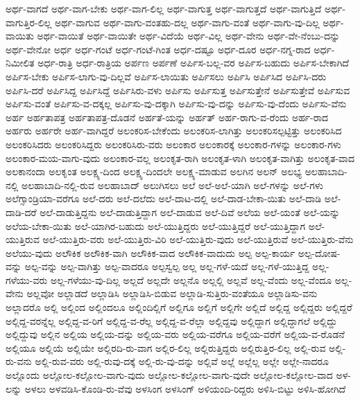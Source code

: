 {ಅರ್ಥ-ವಾಗದೆ
ಅರ್ಥ-ವಾಗ-ಬೇಕು
ಅರ್ಥ-ವಾಗ-ಲಿಲ್ಲ
ಅರ್ಥ-ವಾಗುತ್ತ
ಅರ್ಥ-ವಾಗುತ್ತದೆ
ಅರ್ಥ-ವಾಗುತ್ತಿದೆ
ಅರ್ಥ-ವಾಗುತ್ತಿರ-ಲಿಲ್ಲ
ಅರ್ಥ-ವಾಗುವ
ಅರ್ಥ-ವಾಗು-ವಂತಹು-ದಲ್ಲ
ಅರ್ಥ-ವಾಗು-ವಂತೆ
ಅರ್ಥ-ವಾಗು-ವು-ದಿಲ್ಲ
ಅರ್ಥ-ವಾಯಿತು
ಅರ್ಥ-ವಾಯಿತೆ
ಅರ್ಥ-ವಾಯಿತೇ
ಅರ್ಥ-ವಿದೆಯೆ
ಅರ್ಥ-ವಿಲ್ಲ
ಅರ್ಥ-ವೇನು
ಅರ್ಥ-ವೇ-ನೆಂಬು-ದನ್ನು
ಅರ್ಥ-ವೇನೋ
ಅರ್ಧ
ಅರ್ಧ-ಗಂಟೆ
ಅರ್ಧ-ಗಂಟೆ-ಗಿಂತ
ಅರ್ಧ-ದಷ್ಟೂ
ಅರ್ಧ-ದೂರ
ಅರ್ಧ-ನಗ್ನ-ರಾದ
ಅರ್ಧ-ನಿಮೀಲಿತ
ಅರ್ಧ-ರಾತ್ರಿ
ಅರ್ಧ-ರಾತ್ರಿಯ
ಅರ್ಪಣ
ಅರ್ಪಣೆ
ಅರ್ಪಿಸ-ಬಲ್ಲ-ವರ
ಅರ್ಪಿಸ-ಬಹುದು
ಅರ್ಪಿಸ-ಬೇಕಾಗಿದೆ
ಅರ್ಪಿಸ-ಬೇಕು
ಅರ್ಪಿಸ-ಲಾಗು-ವು-ದಿಲ್ಲವೆ
ಅರ್ಪಿಸ-ಲಾಯಿತು
ಅರ್ಪಿಸಲು
ಅರ್ಪಿಸಿ
ಅರ್ಪಿಸಿದ
ಅರ್ಪಿಸಿ-ದರು
ಅರ್ಪಿಸಿ-ದರೆ
ಅರ್ಪಿಸಿದ್ದ
ಅರ್ಪಿಸಿದ್ದೆ
ಅರ್ಪಿಸಿರು-ವಳು
ಅರ್ಪಿಸು
ಅರ್ಪಿಸುತ್ತ
ಅರ್ಪಿಸುತ್ತೇನೆ
ಅರ್ಪಿಸುತ್ತೇವೆ
ಅರ್ಪಿಸುವ
ಅರ್ಪಿಸು-ವಂತೆ
ಅರ್ಪಿಸು-ವ-ದಕ್ಕಲ್ಲ
ಅರ್ಪಿಸು-ವು-ದಕ್ಕಾಗಿ
ಅರ್ಪಿಸು-ವು-ದನ್ನು
ಅರ್ಪಿಸು-ವು-ದೆಂದು
ಅರ್ಪಿಸು-ವೆನು
ಅರ್ಹ
ಅರ್ಹತಾಪತ್ರ
ಅರ್ಹತಾಪತ್ರ-ದೊಡನೆ
ಅರ್ಹತೆ-ಯನ್ನು
ಅರ್ಹತ್
ಅರ್ಹ-ರಾಗು-ವ-ರೆಂದು
ಅರ್ಹ-ರಾದ
ಅರ್ಹರು
ಅರ್ಹರೇ
ಅರ್ಹ-ವಾಗಿದ್ದರೆ
ಅಲಂಕರಿಸ-ಬೇಕೆಂದು
ಅಲಂಕರಿಸ-ಲಾಗಿತ್ತು
ಅಲಂಕರಿಸಲ್ಪಟ್ಟಿತ್ತು
ಅಲಂಕರಿಸಿದ
ಅಲಂಕರಿಸಿದರು
ಅಲಂಕರಿಸಿದ್ದರು
ಅಲಂಕರಿಸಿರು-ವರು
ಅಲಂಕಾರ
ಅಲಂಕಾರಕ್ಕೆ
ಅಲಂಕಾರ-ಗಳನ್ನು
ಅಲಂಕಾರ-ಗಳು
ಅಲಂಕಾರ-ಮಯ-ವಾಗು-ವುದು
ಅಲಂಕಾರ-ವಲ್ಲ
ಅಲಂಕೃತ-ರಾಗಿ
ಅಲಂಕೃತ-ಳಾಗಿ
ಅಲಂಕೃತ-ವಾಗಿತ್ತು
ಅಲಂಕೃತ-ವಾದ
ಅಲಕಾನಂದಾ
ಅಲಕೃಂತ
ಅಲಕ್ಷ್ಯ-ದಿಂದ
ಅಲಕ್ಷ್ಯ-ದಿಂದಲೇ
ಅಲಕ್ಷ್ಯ-ಮಾಡುವ
ಅಲಗಿನ
ಅಲನ್
ಅಲಭ್ಯ
ಅಲಹಾಬಾದಿ-ನಲ್ಲಿ
ಅಲಹಾಬಾದಿ-ನಲ್ಲಿ-ರುವ
ಅಲಹಾಬಾದ್
ಅಲುಗಿಸಲು
ಅಲೆ
ಅಲೆ-ಅಲೆ-ಯಾಗಿ
ಅಲೆ-ಗಳನ್ನು
ಅಲೆ-ಗಳು
ಅಲೆಗ್ಸಾಂಡ್ರಿಯಾ-ವರೆಗೂ
ಅಲೆ-ದರು
ಅಲೆ-ದಲೆದು
ಅಲೆ-ದಾಟ-ದಲ್ಲಿ
ಅಲೆ-ದಾಡ-ಬೇಕಾ-ಯಿತು
ಅಲೆ-ದಾಡಿ
ಅಲೆ-ದಾಡಿ-ದರೆ
ಅಲೆ-ದಾಡುತ್ತಿದ್ದನು
ಅಲೆ-ದಾಡುತ್ತಿದ್ದಾಗ
ಅಲೆ-ದಾಡುವ
ಅಲೆ-ದಿವೆ
ಅಲೆಯ
ಅಲೆ-ಯಂತೆ
ಅಲೆ-ಯನ್ನು
ಅಲೆಯ-ಬೇಕಾ-ಯಿತು
ಅಲೆ-ಯಾಗಿರ-ಬಹುದು
ಅಲೆ-ಯುತ್ತಿದ್ದರು
ಅಲೆ-ಯುತ್ತಿದ್ದರೆ
ಅಲೆ-ಯುತ್ತಿದ್ದಾಗ
ಅಲೆ-ಯುತ್ತಿರುವ
ಅಲೆ-ಯುತ್ತಿರು-ವರು
ಅಲೆ-ಯುತ್ತಿರು-ವಿರಿ
ಅಲೆ-ಯುತ್ತಿರು-ವುದು
ಅಲೆ-ಯುತ್ತಿರುವೆ
ಅಲೆ-ಯುತ್ತಿರು-ವೆನು
ಅಲೆಯು-ವುದು
ಅಲೌಕಿಕ
ಅಲೌಕಿಕ-ವಾಗಿ
ಅಲೌಕಿಕ-ವಾದ
ಅಲೌಕಿಕ-ವಾದುದು
ಅಲ್ಪ
ಅಲ್ಪ-ಕಾರ್ಯ
ಅಲ್ಪ-ದೋಷ-ವನ್ನು
ಅಲ್ಪ-ವನ್ನು
ಅಲ್ಪ-ವಾಗಿತ್ತು
ಅಲ್ಪ-ವಾದರೂ
ಅಲ್ಪಸ್ವಲ್ಪ
ಅಲ್ಲ
ಅಲ್ಲ-ಗಳೆ-ಯದೆ
ಅಲ್ಲ-ಗಳೆ-ಯುತ್ತಿದ್ದ
ಅಲ್ಲ-ಗಳೆಯು-ವರು
ಅಲ್ಲ-ಗಳೆಯು-ವು-ದಿಲ್ಲ
ಅಲ್ಲದೆ
ಅಲ್ಲದೇ
ಅಲ್ಲನೊ
ಅಲ್ಲಲ್ಲಿ
ಅಲ್ಲವೆ
ಅಲ್ಲ-ವೆಂದು
ಅಲ್ಲ-ವೆಂದೂ
ಅಲ್ಲ-ವೇನು
ಅಲ್ಲವೋ
ಅಲ್ಲಾಡದೆ
ಅಲ್ಲಾಡಿಸಿ
ಅಲ್ಲಾಡಿಸಿ-ಬಿಡುವ
ಅಲ್ಲಾಡಿ-ಸುತ್ತಿರು-ವಂತೆಯೂ
ಅಲ್ಲಾಡಿಸು-ವನು
ಅಲ್ಲಾದರೊ
ಅಲ್ಲಿ
ಅಲ್ಲಿಂದ
ಅಲ್ಲಿಂದಲೂ
ಅಲ್ಲಿಂದಿಲ್ಲಿಗೆ
ಅಲ್ಲಿಗೂ
ಅಲ್ಲಿಗೆ
ಅಲ್ಲಿಗೇ
ಅಲ್ಲಿದೆ
ಅಲ್ಲಿದ್ದ
ಅಲ್ಲಿದ್ದರು
ಅಲ್ಲಿದ್ದರೆ
ಅಲ್ಲಿದ್ದ-ವರನ್ನೆಲ್ಲ
ಅಲ್ಲಿದ್ದ-ವ-ರಿಗೆ
ಅಲ್ಲಿದ್ದ-ವ-ರೆಲ್ಲ
ಅಲ್ಲಿದ್ದ-ವ-ರೆಲ್ಲಾ
ಅಲ್ಲಿದ್ದವು
ಅಲ್ಲಿದ್ದಾಗ
ಅಲ್ಲಿದ್ದಾಗಲೆ
ಅಲ್ಲಿದ್ದು
ಅಲ್ಲಿದ್ದುವು
ಅಲ್ಲಿನ
ಅಲ್ಲಿಯ
ಅಲ್ಲಿಯ-ದನ್ನು
ಅಲ್ಲಿಯ-ವರು
ಅಲ್ಲಿಯ-ವರೆಗೂ
ಅಲ್ಲಿಯ-ವರೆಗೆ
ಅಲ್ಲಿಯ-ವ-ರೊಡನೆ
ಅಲ್ಲಿಯೂ
ಅಲ್ಲಿಯೆ
ಅಲ್ಲಿಯೇ
ಅಲ್ಲಿರದಿ-ರು-ವಾಗ
ಅಲ್ಲಿರ-ಲಿಲ್ಲ
ಅಲ್ಲಿರುತ್ತಿದ್ದರು
ಅಲ್ಲಿರುತ್ತಿರ-ಲಿಲ್ಲ
ಅಲ್ಲಿ-ರುವ
ಅಲ್ಲಿ-ರು-ವನು
ಅಲ್ಲಿ-ರುವ-ವರು
ಅಲ್ಲಿ-ರುವು-ದಕ್ಕೆ
ಅಲ್ಲಿ-ರು-ವು-ದನ್ನು
ಅಲ್ಲಿವೆ
ಅಲ್ಲೆ
ಅಲ್ಲೆಲ್ಲ
ಅಲ್ಲೇ
ಅಲ್ಲೇ-ನಾದರೂ
ಅಲ್ಲೊಂದು
ಅಲ್ಲೋಲ-ಕಲ್ಲೋಲ-ವಾಗು-ವುದು
ಅಲ್ಲೋಲ-ಕಲ್ಲೋಲ-ವಾಗು-ವುದೇ
ಅಲ್ಲೋಲ-ಕಲ್ಲೋಲ-ವಾದ
ಅಳ-ಲನ್ನು
ಅಳಲು
ಅಳವಡಿಸಿ-ಕೊಂಡಿ-ರು-ವೆವು
ಅಳಸಿಂಗ
ಅಳಸಿಂಗ್
ಅಳಿಯಂದಿ-ರಿದ್ದರು
ಅಳಿಸಿ-ಬಿಟ್ಟು
ಅಳಿಸಿ-ಹೋಗಿದೆ
}

